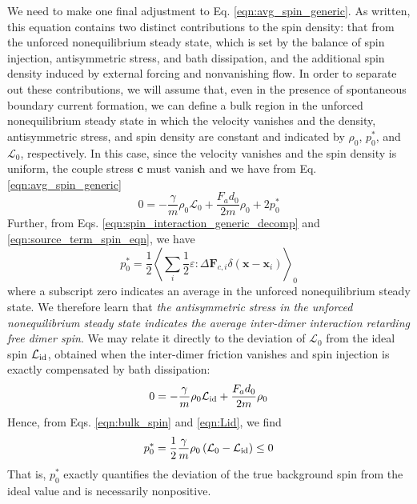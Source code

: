 \documentclass[%
 reprint,
superscriptaddress,
longbibliography,
 amsmath,amssymb,
 prl,
 citeautoscript,
]{revtex4-1}
\begin{document}
We need to make one final adjustment to Eq. \ref{eqn:avg_spin_generic}. As written, this equation contains two distinct contributions to the spin density: that from the unforced nonequilibrium steady state, which is set by the balance of spin injection, antisymmetric stress, and bath dissipation, and the additional spin density induced by external forcing and nonvanishing flow. In order to separate out these contributions, we will assume that, even in the presence of spontaneous boundary current formation, we can define a bulk region in the unforced nonequilibrium steady state in which the velocity vanishes and the density, antisymmetric stress, and spin density are constant and indicated by $\rho_0$, $p_0^*$, and $\mathcal{L}_0$, respectively. In this case, since the velocity vanishes and the spin density is uniform, the couple stress ${\boldsymbol c}$ must vanish and we have from Eq. \ref{eqn:avg_spin_generic}
\begin{equation}
0 = - \frac{\gamma}{m} \rho_0 \mathcal{L}_0 + \frac{F_a d_0}{2 m} \rho_0 + 2 p^*_0
\label{eqn:bulk_spin}
\end{equation}
Further, from Eqs. \ref{eqn:spin_interaction_generic_decomp} and \ref{eqn:source_term_spin_eqn}, we have
\begin{equation}
p_0^* = \frac{1}{2} \left\langle \sum_i \frac{1}{2} \varepsilon : \Delta {\boldsymbol F}_{c,i} \delta \left( {\boldsymbol x} - {\boldsymbol x}_i \right) \right\rangle_0
\label{eqn:p0star}
\end{equation}
where a subscript zero indicates an average in the unforced nonequilibrium steady state. We therefore learn that {\it the antisymmetric stress in the unforced nonequilibrium steady state indicates the average inter-dimer interaction retarding free dimer spin}. We may relate it directly to the deviation of $\mathcal{L}_0$ from the ideal spin $\mathcal{L}_{\rm id}$, obtained when the inter-dimer friction vanishes and spin injection is exactly compensated by bath dissipation:
\begin{equation}
0 = - \frac{\gamma}{m} \rho_0 \mathcal{L}_{\rm id} + \frac{F_a d_0}{2 m} \rho_0
\label{eqn:Lid}
\end{equation}
Hence, from Eqs. \ref{eqn:bulk_spin} and \ref{eqn:Lid}, we find
\begin{equation}
p_0^* = \frac{1}{2} \frac{\gamma}{m} \rho_0 \left( \mathcal{L}_0 - \mathcal{L}_{\rm id} \right) \leq 0
\label{eqn:pstar0_L}
\end{equation}
That is, $p_0^*$ exactly quantifies the deviation of the true background spin from the ideal value and is necessarily nonpositive.
\end{document}

